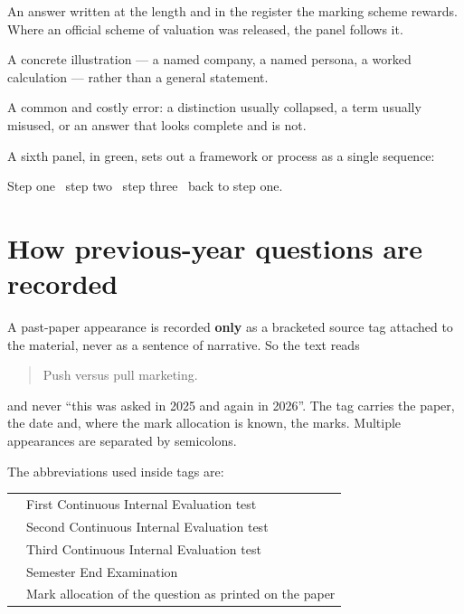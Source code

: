 \begin{exambox}
An answer written at the length and in the register the marking scheme
rewards. Where an official scheme of valuation was released, the panel follows
it.
\end{exambox}

\begin{examplebox}
A concrete illustration --- a named company, a named persona, a worked
calculation --- rather than a general statement.
\end{examplebox}

\begin{warnbox}
A common and costly error: a distinction usually collapsed, a term usually
misused, or an answer that looks complete and is not.
\end{warnbox}

A sixth panel, in green, sets out a framework or process as a single
sequence:

\begin{frameworkbox}[Framework]
Step one \ra\ step two \ra\ step three \ra\ back to step one.
\end{frameworkbox}

\section*{How previous-year questions are recorded}

\begin{keybox}
A past-paper appearance is recorded \textbf{only} as a bracketed source tag
attached to the material, never as a sentence of narrative. So the text reads
\begin{quote}\sffamily\footnotesize
Push versus pull marketing. 
\end{quote}
and never ``this was asked in 2025 and again in 2026''. The tag carries the
paper, the date and, where the mark allocation is known, the marks. Multiple
appearances are separated by semicolons.
\end{keybox}

\noindent The abbreviations used inside tags are:

\vspace{4pt}
{\sffamily\small
\begin{tabular}{@{}P{0.14\textwidth}P{0.80\textwidth}@{}}
\toprule[1.1pt]
 & First Continuous Internal Evaluation test\\
 & Second Continuous Internal Evaluation test\\
 & Third Continuous Internal Evaluation test\\
 & Semester End Examination\\
 & Mark allocation of the question as printed on the paper\\
\bottomrule[1.1pt]
\end{tabular}}

